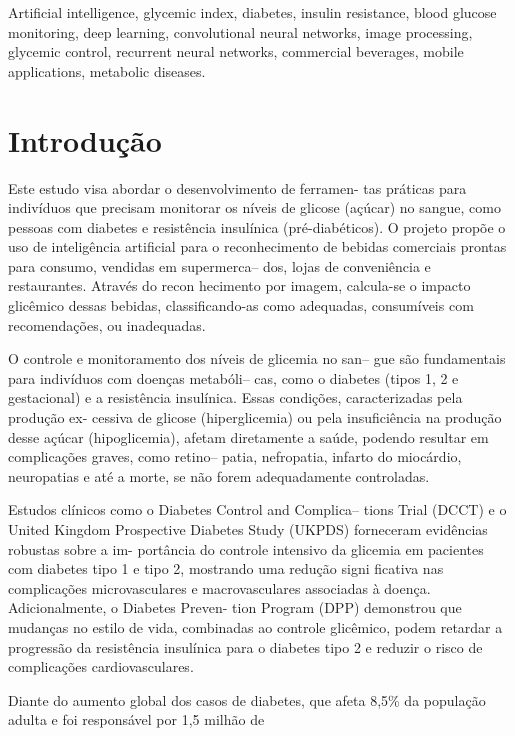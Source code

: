 \documentclass[conference]{IEEEtran}
\begin{document}
\begin{IEEEkeywords}
\sloppy
Artificial intelligence, glycemic index, diabetes, insulin resistance, blood glucose monitoring, deep learning, convolutional neural networks, image processing, glycemic control, recurrent neural networks, commercial beverages, mobile applications, metabolic diseases.
\fussy
\end{IEEEkeywords}

\section{Introdução}
\sloppy
Este estudo visa abordar o desenvolvimento de ferramen-
tas práticas para indivíduos que precisam monitorar os níveis 
de glicose (açúcar) no sangue, como pessoas com diabetes 
e resistência insulínica (pré-diabéticos). O projeto propõe o 
uso de inteligência artificial para o reconhecimento de bebidas 
comerciais prontas para consumo, vendidas em supermerca--
dos, lojas de conveniência e restaurantes. Através do recon
hecimento por imagem, calcula-se o impacto glicêmico dessas 
bebidas, classificando-as como adequadas, consumíveis com 
recomendações, ou inadequadas.
\par
O controle e monitoramento dos níveis de glicemia no san--
gue são fundamentais para indivíduos com doenças metabóli--
cas, como o diabetes (tipos 1, 2 e gestacional) e a resistência 
insulínica. Essas condições, caracterizadas pela produção ex-
cessiva de glicose (hiperglicemia) ou pela insuficiência na
produção desse açúcar (hipoglicemia), afetam diretamente a
saúde, podendo resultar em complicações graves, como retino--
patia, nefropatia, infarto do miocárdio, neuropatias e até a
morte, se não forem adequadamente controladas\cite{b1}.
\par
Estudos clínicos como o Diabetes Control and Complica--
tions Trial (DCCT) e o United Kingdom Prospective Diabetes
Study (UKPDS) forneceram evidências robustas sobre a im-
portância do controle intensivo da glicemia em pacientes
com diabetes tipo 1 e tipo 2, mostrando uma redução signi
ficativa nas complicações microvasculares e macrovasculares
associadas à doença\cite{b1}. Adicionalmente, o Diabetes Preven-
tion Program (DPP) demonstrou que mudanças no estilo de
vida, combinadas ao controle glicêmico, podem retardar a
progressão da resistência insulínica para o diabetes tipo 2
e reduzir o risco de complicações cardiovasculares\cite{b2}.
\par
Diante do aumento global dos casos de diabetes, que afeta 
8,5\% da população adulta e foi responsável por 1,5 milhão de
\end{document}
